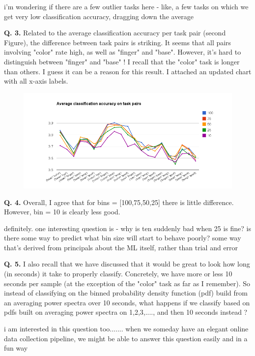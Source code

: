 i'm wondering if there are a few outlier tasks here - like, a few tasks on which we get very low classification accuracy, dragging down the average
 

{\bf Q. 3.} Related to the average classification accuracy per task pair (second Figure), the difference between task pairs is striking. It seems that all pairs involving "color" rate high, as well as "finger" and "base". However, it's hard to distinguish between "finger" and "base" ! I recall that the "color" task is longer than others. I guess it can be a reason for this result. I attached an updated chart with all x-axis labels.

\begin{figure}
\begin{center}
\includegraphics[width=6in]{Figures/avg_classification_accuracy_taskpairs.png}
\caption{ }
\label{ }
\end{center}
\end{figure}

{\bf Q. 4.} Overall, I agree that for bins = [100,75,50,25] there is little difference. However, bin = 10 is clearly less good.


definitely. one interesting question is - why is ten suddenly bad when 25 is fine? is there some way to predict what bin size will start to behave poorly? some way that's derived from principals about the ML itself, rather than trial and error
 


{\bf Q. 5.} I also recall that we have discussed that it would be great to look how long (in seconds) it take to properly classify. Concretely, we have more or less 10 seconds per sample (at the exception of the "color" task as far as I remember). So instead of classifying on the binned probability density function (pdf) build from an averaging power spectra over 10 seconds, what happens if we classify based on pdfs built on averaging power spectra on 1,2,3,...., and then 10 seconds instead ?

 
i am interested in this question too....... when we someday have an elegant online data collection pipeline, we might be able to answer this question easily and in a fun way